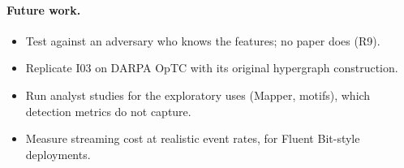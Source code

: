 \paragraph{Future work.}
\begin{itemize}
  \item Test against an adversary who knows the features; no paper does (R9).
  \item Replicate I03 on DARPA OpTC with its original hypergraph construction.
  \item Run analyst studies for the exploratory uses (Mapper, motifs), which detection metrics do not capture.
  \item Measure streaming cost at realistic event rates, for Fluent Bit-style deployments.
\end{itemize}
